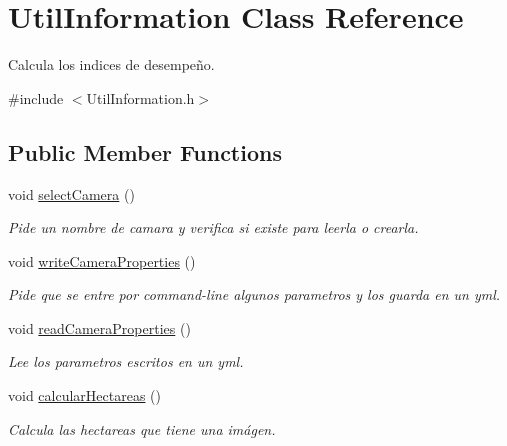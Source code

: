 \hypertarget{classUtilInformation}{}\section{Util\+Information Class Reference}
\label{classUtilInformation}


Calcula los indices de desempeño.  




{\ttfamily \#include $<$Util\+Information.\+h$>$}

\subsection*{Public Member Functions}
\begin{DoxyCompactItemize}
\item 
\mbox{\label{classUtilInformation_afec1ac4e05845098092d1e27a1ae338b}} 
void \mbox{\hyperlink{classUtilInformation_afec1ac4e05845098092d1e27a1ae338b}{select\+Camera}} ()
\begin{DoxyCompactList}\small\item\em Pide un nombre de camara y verifica si existe para leerla o crearla. \end{DoxyCompactList}\item 
\mbox{\label{classUtilInformation_a184ee49faaa5054067a5391276fed308}} 
void \mbox{\hyperlink{classUtilInformation_a184ee49faaa5054067a5391276fed308}{write\+Camera\+Properties}} ()
\begin{DoxyCompactList}\small\item\em Pide que se entre por command-\/line algunos parametros y los guarda en un yml. \end{DoxyCompactList}\item 
\mbox{\label{classUtilInformation_ad041e21d55e3e992304454196f52d30a}} 
void \mbox{\hyperlink{classUtilInformation_ad041e21d55e3e992304454196f52d30a}{read\+Camera\+Properties}} ()
\begin{DoxyCompactList}\small\item\em Lee los parametros escritos en un yml. \end{DoxyCompactList}\item 
void \mbox{\hyperlink{classUtilInformation_a47f1a60e6815a3b1642a3324c476fb32}{calcular\+Hectareas}} ()
\begin{DoxyCompactList}\small\item\em Calcula las hectareas que tiene una imágen. \end{DoxyCompactList}\end{DoxyCompactItemize}

